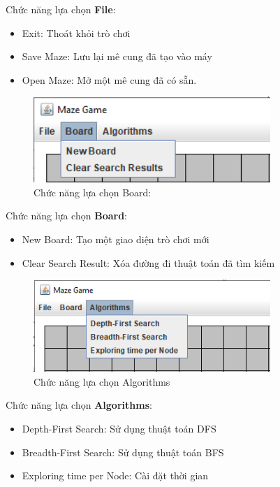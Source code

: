 Chức năng lựa chọn \textbf{File}:
\begin{itemize}
	\item Exit: Thoát khỏi trò chơi
	\item Save Maze: Lưu lại mê cung đã tạo vào máy
	\item Open Maze: Mở một mê cung đã có sẵn.
\end{itemize}

\begin{figure}[h!]
	\centering
	\includegraphics[width=0.8\textwidth]{
		Figures/figs/3.PNG
	}
	\caption[Chức năng lựa chọn Board:]{
		Chức năng lựa chọn Board: 
	}
	\label{fig:hinhg}
\end{figure}

Chức năng lựa chọn \textbf{Board}:
\begin{itemize}
	\item New Board: Tạo một giao diện trò chơi mới
	\item Clear Search Result: Xóa đường đi thuật toán đã tìm kiếm
\end{itemize}

\begin{figure}[h!]
	\centering
	\includegraphics[width=0.8\textwidth]{
		Figures/figs/4.PNG 
	}
	\caption[Chức năng lựa chọn Algorithms]{
		Chức năng lựa chọn Algorithms 
	}
	\label{fig:hinhh}
\end{figure}

Chức năng lựa chọn \textbf{Algorithms}:
\begin{itemize}
	\item Depth-First Search: Sử dụng thuật toán DFS
	\item Breadth-First Search: Sử dụng thuật toán BFS
	\item Exploring time per Node: Cài đặt thời gian
\end{itemize}


